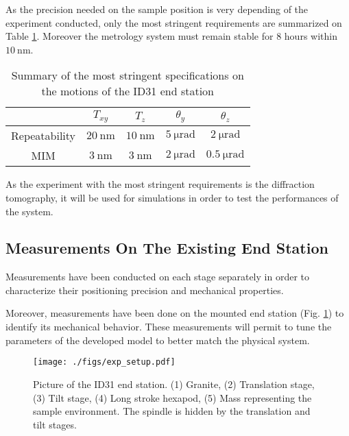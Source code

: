 \documentclass[a4paper, keeplastbox, biblatex]{jacow}
\begin{document}
As the precision needed on the sample position is very depending of the experiment conducted, only the most stringent requirements are summarized on Table \ref{table:specifications}.
Moreover the metrology system must remain stable for 8 hours within \(\SI{10}{\nano\metre}\).

\begin{table}[!htpb]
\caption{\label{table:specifications}
Summary of the most stringent specifications on the motions of the ID31 end station}
\centering
\begin{tabular}{ccccc}
\hline
 & \(T_{xy}\) & \(T_z\) & \(\theta_y\) & \(\theta_z\)\\
\hline
Repeatability & \(\SI{20}{\nano\metre}\) & \(\SI{10}{\nano\metre}\) & \(\SI{5}{\micro\radian}\) & \(\SI{2}{\micro\radian}\)\\
\hline
MIM\footnotemark & \(\SI{3}{\nano\metre}\) & \(\SI{3}{\nano\metre}\) & \(\SI{2}{\micro\radian}\) & \(\SI{0.5}{\micro\radian}\)\\
\hline
\end{tabular}
\end{table}


As the experiment with the most stringent requirements is the diffraction tomography, it will be used for simulations in order to test the performances of the system.

\subsection{Measurements On The Existing End Station}
\label{sec:org55d0f26}
Measurements have been conducted on each stage separately in order to characterize their positioning precision and mechanical properties.

Moreover, measurements have been done on the mounted end station (Fig. \ref{fig:exp_setup}) to identify its mechanical behavior.
These measurements will permit to tune the parameters of the developed model to better match the physical system.

\begin{figure}[htbp]
\centering
\texttt{[image: ./figs/exp\_setup.pdf]}
\caption{\label{fig:exp_setup}
Picture of the ID31 end station. (1) Granite, (2) Translation stage, (3) Tilt stage, (4) Long stroke hexapod, (5) Mass representing the sample environment. The spindle is hidden by the translation and tilt stages.}
\end{figure}
\end{document}
